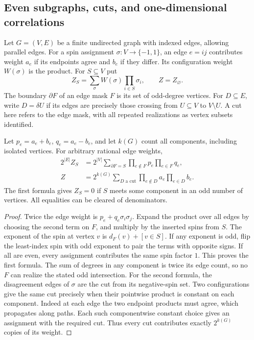 \subsection{Even subgraphs, cuts, and one-dimensional correlations}

Let $G=(V,E)$ be a finite undirected graph with indexed edges, allowing parallel edges. For a spin assignment $\sigma:V\to\{-1,1\}$, an edge $e=ij$ contributes weight $a_e$ if its endpoints agree and $b_e$ if they differ. Its configuration weight $W(\sigma)$ is the product. For $S\subseteq V$ put
\[
 Z_S=\sum_{\sigma}W(\sigma)\prod_{i\in S}\sigma_i,\qquad Z=Z_\varnothing .
\]
The boundary $\partial F$ of an edge mask $F$ is its set of odd-degree vertices. For $D\subseteq E$, write $D=\delta U$ if its edges are precisely those crossing from $U\subseteq V$ to $V\setminus U$. A cut here refers to the edge mask, with all repeated realizations as vertex subsets identified.

\begin{theorem}\label{result74}\label{thm:model-ising}
Let $p_e=a_e+b_e$, $q_e=a_e-b_e$, and let $k(G)$ count all components, including isolated vertices. For arbitrary rational edge weights,
\begin{align*}
 2^{|E|}Z_S &=
 2^{|V|}\sum_{\partial F=S}\prod_{e\notin F}p_e\prod_{e\in F}q_e,\\
 Z &=2^{k(G)}\sum_{D\text{ a cut}}\prod_{e\notin D}a_e\prod_{e\in D}b_e .
\end{align*}
The first formula gives $Z_S=0$ if $S$ meets some component in an odd number of vertices. All equalities can be cleared of denominators.
\end{theorem}
\begin{proof}
Twice the edge weight is $p_e+q_e\sigma_i\sigma_j$. Expand the product over all edges by choosing the second term on $F$, and multiply by the inserted spins from $S$. The exponent of the spin at vertex $v$ is $d_F(v)+[v\in S]$. If any exponent is odd, flip the least-index spin with odd exponent to pair the terms with opposite signs. If all are even, every assignment contributes the same spin factor $1$. This proves the first formula. The sum of degrees in any component is twice its edge count, so no $F$ can realize the stated odd intersection. For the second formula, the disagreement edges of $\sigma$ are the cut from its negative-spin set. Two configurations give the same cut precisely when their pointwise product is constant on each component. Indeed at each edge the two endpoint products must agree, which propagates along paths. Each such componentwise constant choice gives an assignment with the required cut. Thus every cut contributes exactly $2^{k(G)}$ copies of its weight.
\end{proof}

